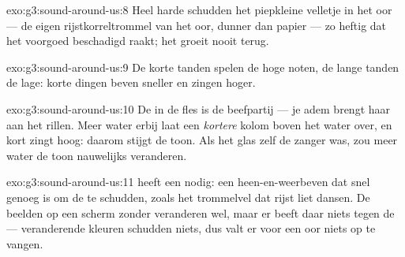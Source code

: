 \begin{solution}{exo:g3:sound-around-us:8}
Heel harde  schudden het piepkleine velletje in het oor --- de
eigen rijstkorreltrommel van het oor, dunner dan papier --- zo heftig
dat het voorgoed beschadigd raakt; het groeit nooit terug.
\end{solution}

\begin{solution}{exo:g3:sound-around-us:9}
De korte tanden spelen de hoge noten, de lange tanden de lage: korte
dingen beven sneller en zingen hoger.
\end{solution}

\begin{solution}{exo:g3:sound-around-us:10}
De  in de fles is de beefpartij --- je adem brengt haar aan het
rillen. Meer water erbij laat een \emph{kortere} kolom  boven het
water over, en kort zingt hoog: daarom stijgt de toon. Als het glas
zelf de zanger was, zou meer water de toon nauwelijks veranderen.
\end{solution}

\begin{solution}{exo:g3:sound-around-us:11}
 heeft een \emph{} nodig: een heen-en-weerbeven dat
snel genoeg is om de  te schudden, zoals het trommelvel dat rijst
liet dansen. De beelden op een scherm zonder  veranderen wel,
maar er beeft daar niets tegen de  --- veranderende kleuren
schudden niets, dus valt er voor een oor niets op te vangen.
\end{solution}

